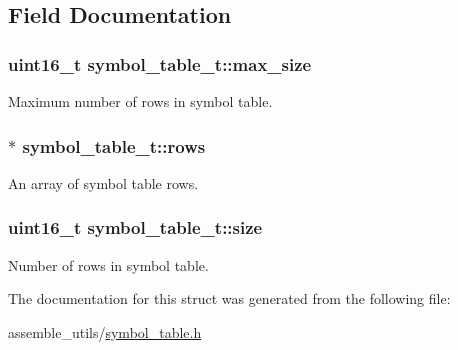 \subsection{Field Documentation}
\subsubsection[{\texorpdfstring{max\+\_\+size}{max_size}}]{\setlength{\rightskip}{0pt plus 5cm}uint16\+\_\+t symbol\+\_\+table\+\_\+t\+::max\+\_\+size}\hypertarget{structsymbol__table__t_ab237aa4717eabb6db3618c1626cf4286}{}\label{structsymbol__table__t_ab237aa4717eabb6db3618c1626cf4286}
Maximum number of rows in symbol table. 
\subsubsection[{\texorpdfstring{rows}{rows}}]{$\ast$ symbol\+\_\+table\+\_\+t\+::rows}\hypertarget{structsymbol__table__t_a6e9f4ff5f1fea234f178daa5f1e120e3}{}\label{structsymbol__table__t_a6e9f4ff5f1fea234f178daa5f1e120e3}
An array of symbol table rows. 
\subsubsection[{\texorpdfstring{size}{size}}]{\setlength{\rightskip}{0pt plus 5cm}uint16\+\_\+t symbol\+\_\+table\+\_\+t\+::size}\hypertarget{structsymbol__table__t_a2e4ac803ab5c1afc3a1042e46b08a508}{}\label{structsymbol__table__t_a2e4ac803ab5c1afc3a1042e46b08a508}
Number of rows in symbol table. 

The documentation for this struct was generated from the following file\+:\begin{DoxyCompactItemize}
\item 
assemble\+\_\+utils/\hyperlink{symbol__table_8h}{symbol\+\_\+table.\+h}\end{DoxyCompactItemize}
